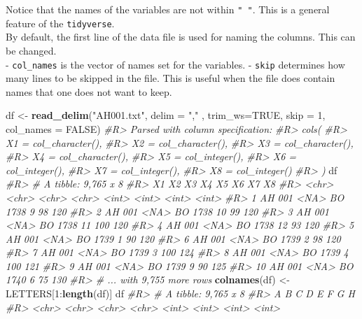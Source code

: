 \documentclass[]{book}
\newenvironment{Shaded}{}{}
\newcommand{\CommentTok}[1]{\textcolor[rgb]{0.38,0.63,0.69}{\textit{#1}}}
\newcommand{\DataTypeTok}[1]{\textcolor[rgb]{0.56,0.13,0.00}{#1}}
\newcommand{\DecValTok}[1]{\textcolor[rgb]{0.25,0.63,0.44}{#1}}
\newcommand{\KeywordTok}[1]{\textcolor[rgb]{0.00,0.44,0.13}{\textbf{#1}}}
\newcommand{\NormalTok}[1]{#1}
\newcommand{\OperatorTok}[1]{\textcolor[rgb]{0.40,0.40,0.40}{#1}}
\newcommand{\OtherTok}[1]{\textcolor[rgb]{0.00,0.44,0.13}{#1}}
\newcommand{\StringTok}[1]{\textcolor[rgb]{0.25,0.44,0.63}{#1}}
\theoremstyle{definition}
\theoremstyle{definition}
\theoremstyle{definition}
\theoremstyle{remark}
\begin{document}
Notice that the names of the variables are not within \texttt{"\ "}.
This is a general feature of the \texttt{tidyverse}.\\
By default, the first line of the data file is used for naming the
columns. This can be changed.\\
- \texttt{col\_names} is the vector of names set for the variables. -
\texttt{skip} determines how many lines to be skipped in the file. This
is useful when the file does contain names that one does not want to
keep.

\begin{Shaded}
\begin{Highlighting}[]
\NormalTok{df <-}\StringTok{ }\KeywordTok{read_delim}\NormalTok{(}\StringTok{"AH001.txt"}\NormalTok{, }\DataTypeTok{delim =} \StringTok{","}\NormalTok{ , }\DataTypeTok{trim_ws=}\OtherTok{TRUE}\NormalTok{,}
                \DataTypeTok{skip =} \DecValTok{1}\NormalTok{, }\DataTypeTok{col_names =} \OtherTok{FALSE}\NormalTok{)}
\CommentTok{#R> Parsed with column specification:}
\CommentTok{#R> cols(}
\CommentTok{#R>   X1 = col_character(),}
\CommentTok{#R>   X2 = col_character(),}
\CommentTok{#R>   X3 = col_character(),}
\CommentTok{#R>   X4 = col_character(),}
\CommentTok{#R>   X5 = col_integer(),}
\CommentTok{#R>   X6 = col_integer(),}
\CommentTok{#R>   X7 = col_integer(),}
\CommentTok{#R>   X8 = col_integer()}
\CommentTok{#R> )}
\NormalTok{df}
\CommentTok{#R> # A tibble: 9,765 x 8}
\CommentTok{#R>    X1    X2    X3    X4       X5    X6    X7    X8}
\CommentTok{#R>    <chr> <chr> <chr> <chr> <int> <int> <int> <int>}
\CommentTok{#R>  1 AH    001   <NA>  BO     1738     9    98   120}
\CommentTok{#R>  2 AH    001   <NA>  BO     1738    10    99   120}
\CommentTok{#R>  3 AH    001   <NA>  BO     1738    11   100   120}
\CommentTok{#R>  4 AH    001   <NA>  BO     1738    12    93   120}
\CommentTok{#R>  5 AH    001   <NA>  BO     1739     1    90   120}
\CommentTok{#R>  6 AH    001   <NA>  BO     1739     2    98   120}
\CommentTok{#R>  7 AH    001   <NA>  BO     1739     3   100   124}
\CommentTok{#R>  8 AH    001   <NA>  BO     1739     4   100   121}
\CommentTok{#R>  9 AH    001   <NA>  BO     1739     9    90   125}
\CommentTok{#R> 10 AH    001   <NA>  BO     1740     6    75   130}
\CommentTok{#R> # ... with 9,755 more rows}
\KeywordTok{colnames}\NormalTok{(df) <-}\StringTok{ }\NormalTok{LETTERS[}\DecValTok{1}\OperatorTok{:}\KeywordTok{length}\NormalTok{(df)]}
\NormalTok{df}
\CommentTok{#R> # A tibble: 9,765 x 8}
\CommentTok{#R>    A     B     C     D         E     F     G     H}
\CommentTok{#R>    <chr> <chr> <chr> <chr> <int> <int> <int> <int>}

\end{Highlighting}
\end{Shaded}
\end{document}
